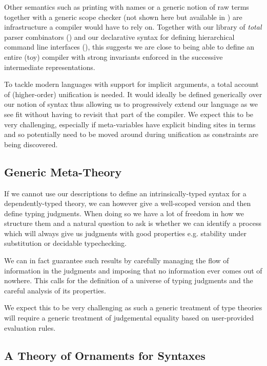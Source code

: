 Other semantics such as printing with names or a generic notion of raw terms
together with a generic scope checker (not shown here but available in
\cite{repo2018})
are infrastructure a compiler would have to rely on. Together with our library
of \emph{total} parser combinators (\cite{allais2018agdarsec}) and our
declarative
syntax for defining hierarchical command line interfaces (\cite{allaisagdargs}),
this suggests we are close to being able to define an entire (toy) compiler with
strong invariants enforced in the successive intermediate representations.

To tackle modern languages with support for implicit arguments, a total account
of (higher-order) unification is needed. It would ideally be defined generically
over our notion of syntax thus allowing us to progressively extend our language
as we see fit without having to revisit that part of the compiler.
%
We expect this to be very challenging, especially if meta-variables have
explicit binding sites in terms and so potentially need to be moved around
during unification as constraints are being discovered.

\subsection{Generic Meta-Theory}

If we cannot use our descriptions to define an intrinsically-typed syntax for
a dependently-typed theory, we can however give a well-scoped version and then
define typing judgments. When doing so we have a lot of freedom in how we
structure them and a natural question to ask is whether we can identify a
process which will always give us judgments with good properties e.g.
stability under substitution or decidable typechecking.

We can in fact guarantee such results by carefully managing the flow of
information in the judgments and imposing that no information ever comes
out of nowhere. This calls for the definition of a universe of typing
judgments and the careful analysis of its properties.

We expect this to be very challenging as such a generic treatment of
type theories will require a generic treatment of judgemental equality
based on user-provided evaluation rules.

\subsection{A Theory of Ornaments for Syntaxes}

